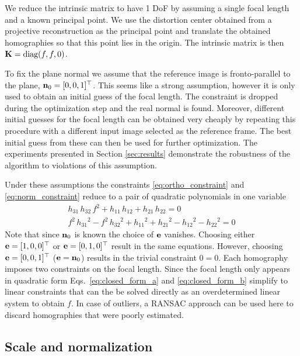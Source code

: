 \documentclass[10pt,twocolumn,letterpaper]{article}
\begin{document}
We reduce the intrinsic matrix to have 1 DoF by assuming a single focal length and a known principal point. We use the distortion center obtained from a projective reconstruction as the principal point and translate the obtained homographies so that this point lies in the origin. The intrinsic matrix is then $\mathbf{K}=\text{diag}(f, f, 0)$. 

To fix the plane normal we assume that the reference image is fronto-parallel to the plane, \ie $\mathbf{n}_0=[0,0,1]^\top$. This seems like a strong assumption, however it is only used to obtain an initial guess of the focal length. The constraint is dropped during the optimization step and the real normal is found. Moreover, different initial guesses for the focal length can be obtained very cheaply by repeating this procedure with a different input image selected as the reference frame. The best initial guess from these can then be used for further optimization. The experiments presented in Section \ref{sec:results} demonstrate the robustness of the algorithm to violations of this assumption.

Under these assumptions the constraints \eqref{eq:ortho_constraint} and \eqref{eq:norm_constraint} reduce to a pair of quadratic polynomials in one variable 
\begin{align}
h_{31}\, h_{32}\, f^2 + h_{11}\, h_{12} + h_{21}\, h_{22}=0
\label{eq:closed_form_a}
\\
f^2\, {h_{31}}^2 - f^2\, {h_{32}}^2 + {h_{11}}^2 + {h_{21}}^2 - {h_{12}}^2 - {h_{22}}^2=0
\label{eq:closed_form_b}
\end{align}
Note that since $\mathbf{n}_0$ is known the choice of $\mathbf{e}$ vanishes. Choosing either $\mathbf{e}=[1,0,0]^\top$ or $\mathbf{e}=[0,1,0]^\top$ result in the same equations. However, choosing $\mathbf{e}=[0,0,1]^\top$ (\ie $\mathbf{e}=\mathbf{n}_0$) results in the trivial constraint $0=0$. Each homography imposes two constraints on the focal length. Since the focal length only appears in quadratic form Eqs.~\eqref{eq:closed_form_a} and \eqref{eq:closed_form_b} simplify to linear constraints that can the be solved directly as an overdetermined linear system to obtain $f$. In case of outliers, a RANSAC approach can be used here to discard homographies that were poorly estimated.

\subsection{Scale and normalization}
\label{sec:calib:normalization}
\end{document}
